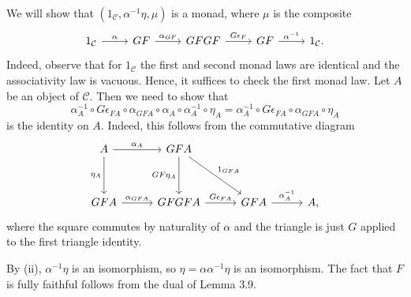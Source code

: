 We will show that $(1_{\mathcal{C}}, \alpha^{-1}\eta, \mu)$ is a monad, where
$\mu$ is the composite
\[\begin{tikzcd}
	1_{\mathcal{C}}\ar[r, "\alpha"] & GF\ar[r, "\alpha_{GF}"] & GFGF\ar[r, "G\epsilon_F"] & GF\ar[r, "\alpha^{-1}"] & 1_{\mathcal{C}}.
\end{tikzcd}\]
Indeed, observe that for $1_{\mathcal{C}}$ the first and second monad laws are
identical and the associativity law is vacuous. Hence, it suffices to check
the first monad law. Let $A$ be an object of $\mathcal{C}$. Then we need to show
that \[\alpha_A^{-1} \circ G\epsilon_{FA} \circ \alpha_{GFA} \circ \alpha_A \circ \alpha^{-1}_A \circ \eta_A = \alpha^{-1}_A \circ G\epsilon_{FA} \circ \alpha_{GFA} \circ \eta_A\]
is the identity on $A$. Indeed, this follows from the commutative diagram
\[\begin{tikzcd}[row sep=1.2cm, column sep=1cm]
	A\ar[r, "\alpha_A"]\ar[d, "\eta_A" left] & GFA\ar[d, "GF\eta_A" left]\ar[dr, "1_{GFA}"]\\
	GFA\ar[r, "\alpha_{GFA}"] & GFGFA\ar[r, "G\epsilon_{FA}"]& GFA\ar[r, "\alpha^{-1}_A"] & A,
\end{tikzcd}\]
where the square commutes by naturality of $\alpha$ and the triangle is just $G$
applied to the first triangle identity.

By (ii), $\alpha^{-1}\eta$ is an isomorphism, so $\eta = \alpha\alpha^{-1}\eta$ is
an isomorphism. The fact that $F$ is fully faithful follows from the dual
of Lemma 3.9.
